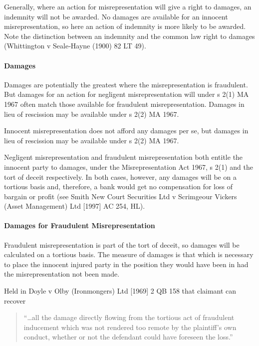 \documentclass[
]{article}
\begin{document}
Generally, where an action for misrepresentation will give a right to
damages, an indemnity will not be awarded. No damages are available for
an innocent misrepresentation, so here an action of indemnity is more
likely to be awarded. Note the distinction between an indemnity and the
common law right to damages (Whittington v Seale‑Hayne (1900) 82 LT 49).

\hypertarget{damages}{%
\paragraph{Damages}\label{damages}}

Damages are potentially the greatest where the misrepresentation is
fraudulent. But damages for an action for negligent misrepresentation
will under s 2(1) MA 1967 often match those available for fraudulent
misrepresentation. Damages in lieu of rescission may be available under
s 2(2) MA 1967.

Innocent misrepresentation does not afford any damages per se, but
damages in lieu of rescission may be available under s 2(2) MA 1967.

Negligent misrepresentation and fraudulent misrepresentation both
entitle the innocent party to damages, under the Misrepresentation Act
1967, s 2(1) and the tort of deceit respectively. In both cases,
however, any damages will be on a tortious basis and, therefore, a bank
would get no compensation for loss of bargain or profit (see Smith New
Court Securities Ltd v Scrimgeour Vickers (Asset Management) Ltd
{[}1997{]} AC 254, HL).

\hypertarget{damages-for-fraudulent-misrepresentation}{%
\paragraph{Damages for Fraudulent
Misrepresentation}\label{damages-for-fraudulent-misrepresentation}}

Fraudulent misrepresentation is part of the tort of deceit, so damages
will be calculated on a tortious basis. The measure of damages is that
which is necessary to place the innocent injured party in the position
they would have been in had the misrepresentation not been made.

Held in Doyle v Olby (Ironmongers) Ltd {[}1969{]} 2 QB 158 that claimant
can recover

\begin{quote}
``\ldots all the damage directly flowing from the tortious act of
fraudulent inducement which was not rendered too remote by the
plaintiff's own conduct, whether or not the defendant could have
foreseen the loss.''
\end{quote}
\end{document}
